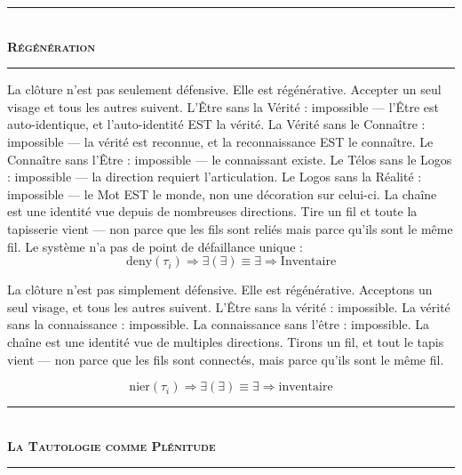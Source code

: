 \documentclass[10pt, openany, oneside]{book}
\renewcommand{\normalsize}{\fontsize{10}{13}\selectfont}
\begin{document}

\begin{center}
    \rule{0.3\textwidth}{0.4pt}\\[0.5em]
    {\normalsize\bfseries\scshape Régénération}\\[0.3em]
    \rule{0.3\textwidth}{0.4pt}
\end{center}

\noindent La clôture n'est pas seulement défensive. Elle est régénérative. Accepter un seul visage et tous les autres suivent. L'Être sans la Vérité : impossible --- l'Être est auto-identique, et l'auto-identité EST la vérité. La Vérité sans le Connaître : impossible --- la vérité est reconnue, et la reconnaissance EST le connaître. Le Connaître sans l'Être : impossible --- le connaissant existe. Le Télos sans le Logos : impossible --- la direction requiert l'articulation. Le Logos sans la Réalité : impossible --- le Mot EST le monde, non une décoration sur celui-ci. La chaîne est une identité vue depuis de nombreuses directions. Tire un fil et toute la tapisserie vient --- non parce que les fils sont reliés mais parce qu'ils sont le même fil. Le système n'a pas de point de défaillance unique :
$$\text{deny}(\tau_i) \Rightarrow \exists(\exists) \equiv \exists \Rightarrow \text{Inventaire}$$

\vspace{1em}

\noindent La clôture n'est pas simplement défensive. Elle est régénérative. Acceptons un seul visage, et tous les autres suivent. L'Être sans la vérité : impossible. La vérité sans la connaissance : impossible. La connaissance sans l'être : impossible. La chaîne est une identité vue de multiples directions. Tirons un fil, et tout le tapis vient --- non parce que les fils sont connectés, mais parce qu'ils sont le même fil.

$$\text{nier}(\tau_i) \Rightarrow \exists(\exists) \equiv \exists \Rightarrow \text{inventaire}$$

\vspace{1.5em}


\begin{center}
    \rule{0.3\textwidth}{0.4pt}\\[0.5em]
    {\normalsize\bfseries\scshape La Tautologie comme Plénitude}\\[0.3em]
    \rule{0.3\textwidth}{0.4pt}
\end{center}
\end{document}
